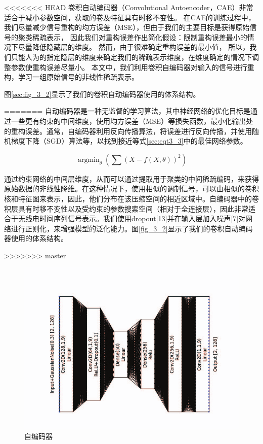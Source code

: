 <<<<<<< HEAD
卷积自动编码器（Convolutional Autoencoder，CAE）非常适合于减小参数空间，获取的卷及特征具有时移不变性。
在CAE的训练过程中，我们尽量减少信号重构的均方误差（MSE），但由于我们的主要目标是获得原始信号的聚类稀疏表示，
因此我们对重构误差作出简化假设：限制重构误差最小的情况下尽量降低隐藏层的维度。
然而，由于很难确定重构误差的最小值，
所以，我们只能人为的指定隐层的维度来确定我们的稀疏表示维度，在维度确定的情况下调整参数使重构误差尽量小。
本文中，我们利用卷积自编码器对输入的信号进行重构，学习一组原始信号的非线性稀疏表示。\par
图\ref{sec:fig_3_2}显示了我们的卷积自动编码器使用的体系结构。\par
=======
自动编码器是一种无监督的学习算法，其中神经网络的优化目标是通过一些更有约束的中间维度，使用均方误差（MSE）等损失函数，最小化输出处的重构误差。通常，自编码器利用反向传播算法，将误差进行反向传播，并使用随机梯度下降（SGD）算法等，以找到接近等式\ref{sec:eqt3_3}中的最佳网络参数。

\begin{equation}\label{sec:eqt3_3}
	\mathop{\arg\min}_{\theta}(\sum(X − f (X,\theta))^2)
\end{equation}

通过约束网络的中间层维度，从而可以通过提取用于聚类的中间稀疏编码，来获得原始数据的非线性降维。在这种情况下，使用相似的调制信号，可以由相似的卷积核和特征图来表示，因此，他们分布在该压缩空间的相近区域中。自编码器中的卷积层具有时移不变性以及受约束的参数搜索空间（相对于全连接层），因此非常适合于无线电时间序列信号表示。我们使用dropout[13]并在输入层加入噪声[7]对网络进行正则化，来增强模型的泛化能力。图\ref{fig_3_2}显示了我们的卷积自动编码器使用的体系结构。\par
>>>>>>> master

\begin{figure}[!h]
	\centering
	\includegraphics[scale=0.3]{figures/chapter_3/CAE}
	\caption{自编码器}	\label{sec:fig_3_3}
\end{figure}

